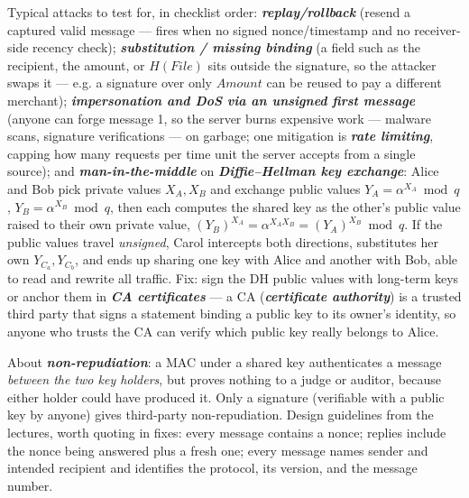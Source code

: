 \documentclass[12pt, a4paper]{article}
\newcommand{\term}[1]{\textbf{\textit{#1}}}        %
\begin{document}
Typical attacks to test for, in checklist order: \term{replay/rollback} (resend a captured valid message --- fires when no signed nonce/timestamp and no receiver-side recency check); \term{substitution / missing binding} (a field such as the recipient, the amount, or $H(File)$ sits outside the signature, so the attacker swaps it --- e.g. a signature over only $Amount$ can be reused to pay a different merchant); \term{impersonation and DoS via an unsigned first message} (anyone can forge message 1, so the server burns expensive work --- malware scans, signature verifications --- on garbage; one mitigation is \term{rate limiting}, capping how many requests per time unit the server accepts from a single source); and \term{man-in-the-middle} on \term{Diffie--Hellman key exchange}: Alice and Bob pick private values $X_A, X_B$ and exchange public values $Y_A = \alpha^{X_A} \bmod q$, $Y_B = \alpha^{X_B} \bmod q$, then each computes the shared key as the other's public value raised to their own private value, $(Y_B)^{X_A} = \alpha^{X_A X_B} = (Y_A)^{X_B} \bmod q$. If the public values travel \emph{unsigned}, Carol intercepts both directions, substitutes her own $Y_{C_a}, Y_{C_b}$, and ends up sharing one key with Alice and another with Bob, able to read and rewrite all traffic. Fix: sign the DH public values with long-term keys or anchor them in \term{CA certificates} --- a CA (\term{certificate authority}) is a trusted third party that signs a statement binding a public key to its owner's identity, so anyone who trusts the CA can verify which public key really belongs to Alice.

About \term{non-repudiation}: a MAC under a shared key authenticates a message \emph{between the two key holders}, but proves nothing to a judge or auditor, because either holder could have produced it. Only a signature (verifiable with a public key by anyone) gives third-party non-repudiation. Design guidelines from the lectures, worth quoting in fixes: every message contains a nonce; replies include the nonce being answered plus a fresh one; every message names sender and intended recipient and identifies the protocol, its version, and the message number.
\end{document}
